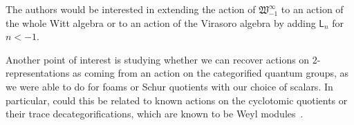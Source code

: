 \documentclass{amsart}
\numberwithin{equation}{section}
\theoremstyle{definition}
\newcommand{\witt}{{\mathfrak{W}}}
\newcommand{\LLn}[1][n]{{\mathsf{L}_{#1}}}
\newcommand{\ourwitt}{{\witt_{-1}^{\infty}}}
\begin{document}
The authors would be interested in extending the action of $\ourwitt$ to an action of the whole Witt algebra or to an action of the Virasoro algebra by adding $\LLn$ for $n < -1$. 

Another point of interest is studying whether we can recover actions on  $2$-representations as coming from an action on the categorified quantum groups, as we were able to do for foams or Schur quotients with our choice of scalars. In particular, could this be related to known actions on the cyclotomic quotients or their trace decategorifications, which are known to be Weyl modules~\cite{Lau-trace3, Lau-trace2}.

%
% 
% 
\end{document}
